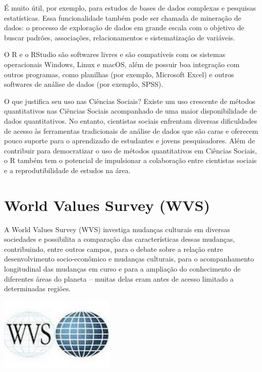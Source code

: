 \documentclass[
  10pt,
  brazil,
  a4paper,
  twoside, notitlepage, openright]{book}
\begin{document}
É muito útil, por exemplo, para estudos de bases de dados complexas e pesquisas estatísticas. Essa funcionalidade também pode ser chamada de mineração de dados: o processo de exploração de dados em grande escala com o objetivo de buscar padrões, associações, relacionamentos e sistematização de variáveis.

O R e o RStudio são softwares livres e são compatíveis com os sistemas operacionais Windows, Linux e macOS, além de possuir boa integração com outros programas, como planilhas (por exemplo, Microsoft Excel) e outros softwares de análise de dados (por exemplo, SPSS).

O que justifica seu uso nas Ciências Sociais? Existe um uso crescente de métodos quantitativos nas Ciências Sociais acompanhado de uma maior disponibilidade de dados quantitativos. No entanto, cientistas sociais enfrentam diversas dificuldades de acesso às ferramentas tradicionais de análise de dados que são caras e oferecem pouco suporte para o aprendizado de estudantes e jovens pesquisadores. Além de contribuir para democratizar o uso de métodos quantitativos em Ciências Sociais, o R também tem o potencial de impulsionar a colaboração entre cientistas sociais e a reprodutibilidade de estudos na área.

\hypertarget{world-values-survey-wvs}{%
\section{World Values Survey (WVS)}\label{world-values-survey-wvs}}

A World Values Survey (WVS) investiga mudanças culturais em diversas sociedades e possibilita a comparação das características dessas mudanças, contribuindo, entre outros campos, para o debate sobre a relação entre desenvolvimento socio-econômico e mudanças culturais, para o acompanhamento longitudinal das mudanças em curso e para a ampliação do conhecimento de diferentes áreas do planeta -- muitas delas eram antes de acesso limitado a determinadas regiões.

\begin{center}\includegraphics[width=2.17in]{img/wvs_asso} \end{center}
\end{document}

